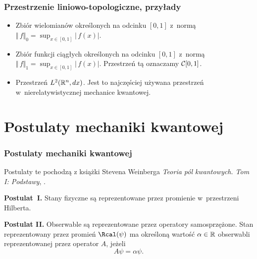 \documentclass[10pt,t]{beamer}
\begin{document}
\begin{frame}
  \frametitle{Przestrzenie liniowo-topologiczne, przyłady}


  \begin{itemize}
    \RaggedRight

  \item Zbiór wielomianów określonych na odcinku $[ 0, 1 ]$ z~normą \\
    $\Vert \, f \Vert_{ 0 } = \sup_{ x \in [ 0, 1 ] } | \, f( x ) |$.

  \item Zbiór funkcji ciągłych określonych na odcinku $[ 0, 1 ]$ z~normą
    $\Vert \, f \Vert_{ 1 } = \sup_{ x \in [ 0, 1 ] } | \, f( x ) |$.
    Przestrzeń tą oznaczamy $\mathcal{C}[ 0, 1 ]$.

  \item Przestrzeń $L^{ 2 }( \mathbb{R}^{ n }, dx) $. Jest to najczęściej używana
    przestrzeń w~nierelatywistycznej mechanice kwantowej.

  \end{itemize}

\end{frame}










\section{Postulaty mechaniki kwantowej}



\begin{frame}
  \frametitle{Postulaty mechaniki kwantowej}


  Postulaty te pochodzą z książki Stevena Weinberga \textit{Teoria pól
    kwantowych. Tom I: Podstawy},
  \cite{WeinbergTeoriaPolKwantowychPodstawy2012}.


  \textbf{Postulat~I.}
  Stany fizyczne są reprezentowane przez promienie w~przestrzeni Hilberta.

  \textbf{Postulat II.}
  Obserwable są reprezentowane przez operatory samosprzężone. Stan
  reprezentowany przez promień $\Rcal( \psi )$ ma określoną wartość $\alpha \in \mathbb{R}$
  obserwabli reprezentowanej przez operator $A$, jeżeli
  \begin{equation}
    \label{eq:Matematyczna-strona-01}
    A \psi = \alpha \psi.
  \end{equation}

\end{frame}
\end{document}
